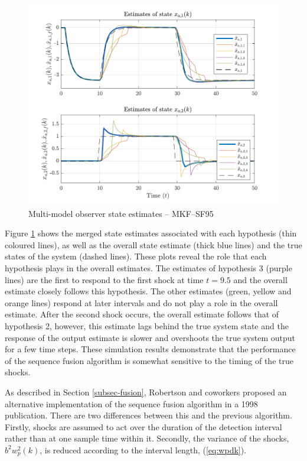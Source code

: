 \begin{figure}[htp]
	\centering
	\includegraphics[width=13cm]{images/rod_MKF_test_sim_MKF_SF95_x_est.pdf}
	\caption{Multi-model observer state estimates – MKF--SF95}
	\label{fig:rod-obs-sim-test-x_est-SF95}
\end{figure}
Figure \ref{fig:rod-obs-sim-test-x_est-SF95} shows the merged state estimates associated with each hypothesis (thin coloured lines), as well as the overall state estimate (thick blue lines) and the true states of the system (dashed lines). These plots reveal the role that each hypothesis plays in the overall estimates. The estimates of hypothesis 3 (purple lines) are the first to respond to the first shock at time $t=9.5$ and the overall estimate closely follows this hypothesis. The other estimates (green, yellow and orange lines) respond at later intervals and do not play a role in the overall estimate. After the second shock occurs, the overall estimate follows that of hypothesis 2, however, this estimate lags behind the true system state and the response of the output estimate is slower and overshoots the true system output for a few time steps. These simulation results demonstrate that the performance of the sequence fusion algorithm is somewhat sensitive to the timing of the true shocks.

As described in Section \ref{subsec-fusion}, Robertson and coworkers proposed an alternative implementation of the sequence fusion algorithm in a 1998 publication. There are two differences between this and the previous algorithm. Firstly, shocks are assumed to act over the duration of the detection interval rather than at one sample time within it. Secondly, the variance of the shocks, $b^2w_{p}^2(k)$, is reduced according to the interval length, (\ref{eq:wpdk}).

